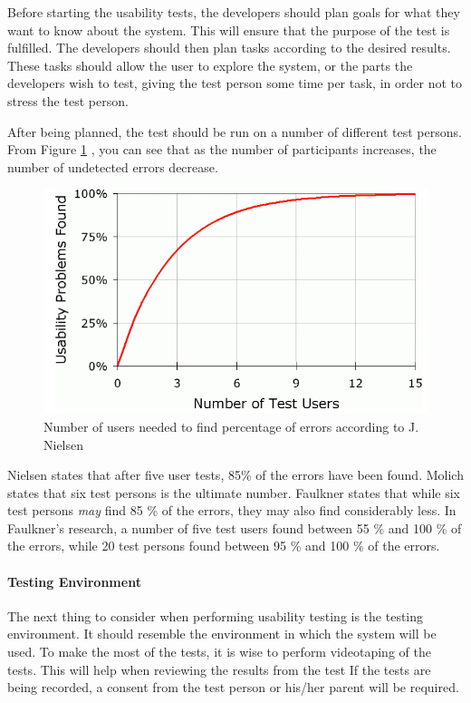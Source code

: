 Before starting the usability tests, the developers should plan goals for what they want to know about the system\cite{isosoftwareengineering}. This will ensure that the purpose of the test is fulfilled. The developers should then plan tasks according to the desired results. These tasks should allow the user to explore the system, or the parts the developers wish to test, giving the test person some time per task, in order not to stress the test person. 

After being planned, the test should be run on a number of different test persons. From Figure \ref{fig:numberoftests}
, you can see that as the number of participants increases, the number of undetected errors decrease. 



 \begin{figure}
 		\centering
 			\includegraphics[scale=0.4]{Pictures/app-screenshots/numberoftests.png}
 		\caption{Number of users needed to find percentage of errors according to J. Nielsen\cite{nielsennumberoftests}}
 		 		\label{fig:numberoftests}
 \end{figure}


Nielsen states that after five user tests, 85\% of the errors have been found\cite{nielsennumberoftests}. Molich\cite{molich2008usable} states that six test persons is the ultimate number. Faulkner\cite{faulkner2003beyond} states that while six test persons \textit{may} find 85 \% of the errors, they may also find considerably less. In Faulkner's research, a number of five test users found between 55 \% and 100 \% of the errors, while 20 test persons found between 95 \% and 100 \% of the errors. 

\paragraph{Testing Environment}
\label{par:testingenvironment}
The next thing to consider when performing usability testing is the testing environment. It should resemble the environment in which the system will be used. To make the most of the tests, it is wise to perform videotaping of the tests. This will help when reviewing the results from the test If the tests are being recorded, a consent from the test person or his/her parent will be required.

